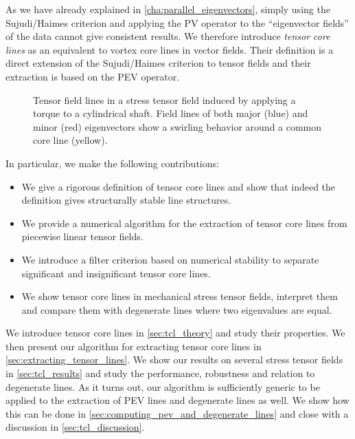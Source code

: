 %
As we have already explained in \cref{cha:parallel_eigenvectors}, simply using
the Sujudi/Haimes criterion and applying the \ac{PV} operator to the
``eigenvector fields'' of the data cannot give consistent results.
%
We therefore introduce \emph{tensor core lines} as an equivalent to vortex
core lines in vector fields.
%
Their definition is a direct extension of the Sujudi/Haimes criterion to tensor
fields and their extraction is based on the \ac{PEV} operator.
%
\begin{figure}[t]
    \centering
    \setlength\figurewidth\textwidth
    
    \vspace*{-9mm}
    \caption{Tensor field lines in a stress tensor field induced by
             applying a torque to a cylindrical shaft. Field lines of both major
             (blue) and minor (red) eigenvectors show a swirling behavior around
             a common core line (yellow).}
    \label{fig:tube_lines}
\end{figure}
%
In particular, we make the following contributions:
%
\begin{itemize}
    \item  We give a rigorous definition of tensor core lines and show that
    indeed the definition gives structurally stable line structures.
    \item We provide a numerical algorithm for the extraction of tensor core
    lines from piecewise linear tensor fields.
    \item We introduce a filter criterion based on numerical stability to
    separate significant and insignificant tensor core lines.
    \item We show tensor core lines in mechanical stress tensor fields,
    interpret them and compare them with degenerate lines where two eigenvalues
    are equal.
\end{itemize}
%
We introduce tensor core lines in \cref{sec:tcl_theory} and study their
properties.
%
We then present our algorithm for extracting tensor core lines in
\cref{sec:extracting_tensor_lines}.
%
We show our results on several stress tensor fields in \cref{sec:tcl_results}
and study the performance, robustness and relation to degenerate lines.
%
As it turns out, our algorithm is sufficiently generic to be applied to the
extraction of \ac{PEV} lines and degenerate lines as well.
%
We show how this can be done in \cref{sec:computing_pev_and_degenerate_lines}
and close with a discussion in \cref{sec:tcl_discussion}.
%
